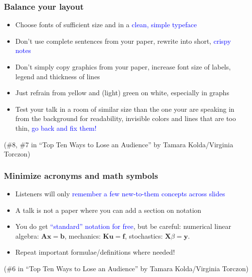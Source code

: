 \documentclass[aspectratio=43,10pt,ucs]{beamer} %
\newcommand{\bfA}{{\mathbf A}}
\newcommand{\bfK}{{\mathbf K}}
\newcommand{\bfX}{{\mathbf X}}
\newcommand{\bfb}{{\mathbf b}}
\newcommand{\bff}{{\mathbf f}}
\newcommand{\bfu}{{\mathbf u}}
\newcommand{\bfx}{{\mathbf x}}
\newcommand{\bfy}{{\mathbf y}}
\begin{document}
\begin{frame}
  \frametitle{Balance your layout}

  \begin{itemize}
  \item Choose fonts of \alert{sufficient size} and in a
    \textcolor{blue}{clean, simple typeface}
  \item Don't use complete sentences from your paper, rewrite into
    short, \textcolor{blue}{crispy notes}
  \item Don't simply copy graphics from your paper, \alert{increase
      font size} of labels, legend and \alert{thickness of lines}
  \item Just \alert{refrain from yellow and (light) green on white},
    especially in graphs
  \item Test your talk in a room of similar size than the one your are
    speaking in from the background for readability, invisible colors
    and lines that are too thin, \textcolor{blue}{go back and fix
      them!}
  \end{itemize}
  
  \vspace*{1em}
  
  (\#8, \#7 in ``Top Ten Ways to Lose an Audience'' by Tamara
   Kolda/Virginia Torczon)

\end{frame}
\begin{frame}
  \frametitle{Minimize acronyms and math symbols}

  \begin{itemize}
  \item Listeners will only \textcolor{blue}{remember a few
      new-to-them concepts across slides}
  \item A talk is not a paper where you can add a section on notation
  \item You do get \textcolor{blue}{``standard'' notation for free},
    but be careful: numerical linear algebra: $\bfA\bfx=\bfb$, mechanics:
    $\bfK\bfu=\bff$, stochastics: $\bfX\beta=\bfy$.
  \item \alert{Repeat important formulae/definitions} where needed!
  \end{itemize}

  \vspace*{3em}
  
  (\#6 in ``Top Ten Ways to Lose an Audience'' by Tamara
   Kolda/Virginia Torczon)

\end{frame}
\end{document}
